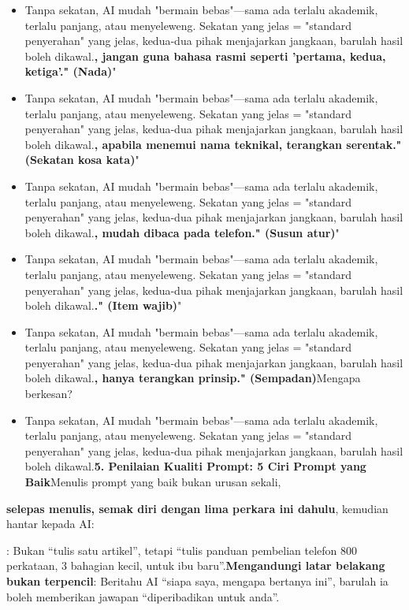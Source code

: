
\begin{itemize}
  \item Tanpa sekatan, AI mudah "bermain bebas"—sama ada terlalu akademik, terlalu panjang, atau menyeleweng. Sekatan yang jelas = "standard penyerahan" yang jelas, kedua-dua pihak menjajarkan jangkaan, barulah hasil boleh dikawal.\textbf{, jangan guna bahasa rasmi seperti 'pertama, kedua, ketiga'." (Nada)}"
  \item Tanpa sekatan, AI mudah "bermain bebas"—sama ada terlalu akademik, terlalu panjang, atau menyeleweng. Sekatan yang jelas = "standard penyerahan" yang jelas, kedua-dua pihak menjajarkan jangkaan, barulah hasil boleh dikawal.\textbf{, apabila menemui nama teknikal, terangkan serentak." (Sekatan kosa kata)}"
  \item Tanpa sekatan, AI mudah "bermain bebas"—sama ada terlalu akademik, terlalu panjang, atau menyeleweng. Sekatan yang jelas = "standard penyerahan" yang jelas, kedua-dua pihak menjajarkan jangkaan, barulah hasil boleh dikawal.\textbf{, mudah dibaca pada telefon." (Susun atur)}"
  \item Tanpa sekatan, AI mudah "bermain bebas"—sama ada terlalu akademik, terlalu panjang, atau menyeleweng. Sekatan yang jelas = "standard penyerahan" yang jelas, kedua-dua pihak menjajarkan jangkaan, barulah hasil boleh dikawal.\textbf{." (Item wajib)}"
  \item Tanpa sekatan, AI mudah "bermain bebas"—sama ada terlalu akademik, terlalu panjang, atau menyeleweng. Sekatan yang jelas = "standard penyerahan" yang jelas, kedua-dua pihak menjajarkan jangkaan, barulah hasil boleh dikawal.\textbf{, hanya terangkan prinsip." (Sempadan)}Mengapa berkesan?
  \item Tanpa sekatan, AI mudah "bermain bebas"—sama ada terlalu akademik, terlalu panjang, atau menyeleweng. Sekatan yang jelas = "standard penyerahan" yang jelas, kedua-dua pihak menjajarkan jangkaan, barulah hasil boleh dikawal.\textbf{5. Penilaian Kualiti Prompt: 5 Ciri Prompt yang Baik}Menulis prompt yang baik bukan urusan sekali,
\end{itemize}

\textbf{selepas menulis, semak diri dengan lima perkara ini dahulu}, kemudian hantar kepada AI:


: Bukan “tulis satu artikel”, tetapi “tulis panduan pembelian telefon 800 perkataan, 3 bahagian kecil, untuk ibu baru”.\textbf{Mengandungi latar belakang bukan terpencil}: Beritahu AI “siapa saya, mengapa bertanya ini”, barulah ia boleh memberikan jawapan “diperibadikan untuk anda”.

